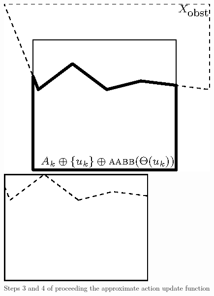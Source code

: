 \begin{figure}
  \centering
  \begin{minipage}[b]{0.45\linewidth}
    \includegraphics[scale=1.25]{figs/rect-update3}%
  \end{minipage}
  \bigskip
  \begin{minipage}[b]{0.45\linewidth}
    \includegraphics[scale=1.25]{figs/rect-update4}
  \end{minipage}
  \caption{Steps 3 and 4 of proceeding the approximate action update function}
  \label{fig:rect-update34}
\end{figure}

